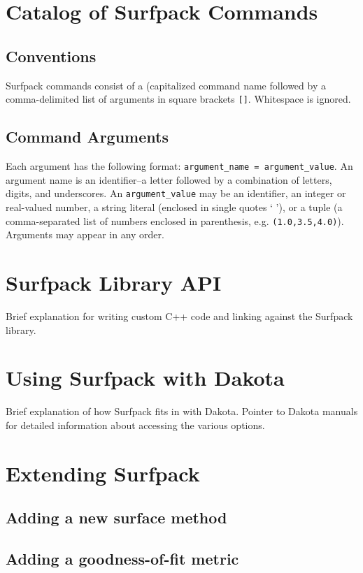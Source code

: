 \documentclass{article}
\begin{document}
\section{Catalog of Surfpack Commands}\label{sec:commands}
\subsection{Conventions}

Surfpack commands consist of a (capitalized command name followed by a
comma-delimited list of arguments in square brackets \texttt{[]}.
Whitespace is ignored.


\subsection{Command Arguments}\label{sec:arguments}

Each argument has the following format: \texttt{argument\_name =
  argument\_value}.  An argument name is an identifier--a letter
followed by a combination of letters, digits, and underscores.  An
\texttt{argument\_value} may be an identifier, an integer or
real-valued number, a string literal (enclosed in single quotes ` '),
or a tuple (a comma-separated list of numbers enclosed in parenthesis,
e.g. \texttt{(1.0,3.5,4.0)}).  Arguments may appear in any order.

\section{Surfpack Library API}
Brief explanation for writing custom C++ code and linking against the Surfpack library.

\section{Using Surfpack with Dakota}
Brief explanation of how Surfpack fits in with Dakota.  Pointer to Dakota manuals for detailed information about accessing the various options.

\section{Extending Surfpack}
\subsection{Adding a new surface method}
\subsection{Adding a goodness-of-fit metric}
\end{document}
